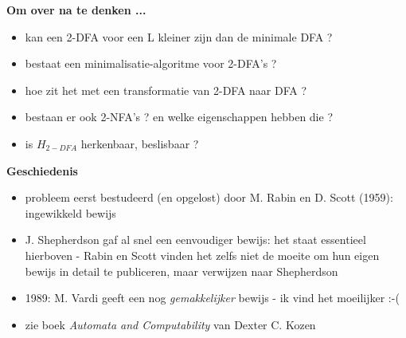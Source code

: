 \documentclass{seminar}
\begin{document}
\begin{slide}
{\bf Om over na te denken ...}

\begin{itemize}
\item 
kan een 2-DFA voor een L kleiner zijn dan de minimale DFA ?

\item 
bestaat een minimalisatie-algoritme voor 2-DFA's ?

\item
hoe zit het met een transformatie van 2-DFA naar DFA ?

\item 
bestaan er ook 2-NFA's ? en welke eigenschappen hebben die ?

\item 
is $H_{2-DFA}$ herkenbaar, beslisbaar ?


\end{itemize}


\end{slide} 

\begin{slide}
{\bf Geschiedenis}

\begin{itemize}
\item 
probleem eerst bestudeerd (en opgelost) door M. Rabin en D. Scott (1959):
ingewikkeld bewijs
\item 
J. Shepherdson gaf al snel een eenvoudiger bewijs: het staat essentieel
hierboven - Rabin en Scott vinden het zelfs niet de moeite om hun
eigen bewijs in detail te publiceren, maar verwijzen naar Shepherdson
\item 
1989: M. Vardi geeft een nog {\em gemakkelijker} bewijs - ik vind het moeilijker :-(
\item
zie boek {\em Automata and Computability} van Dexter C. Kozen
\end{itemize}

\end{slide} 
\end{document}
